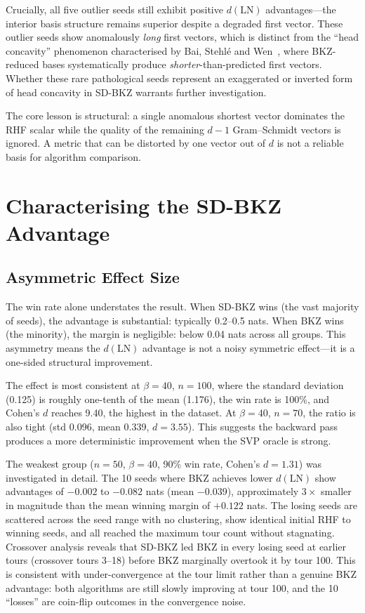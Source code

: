 \documentclass[journal=cic,version=preprint]{iacrj}
\begin{document}
Crucially, all five outlier seeds still exhibit positive $d(\mathrm{LN})$ advantages---the interior basis structure remains superior despite a degraded first vector. These outlier seeds show anomalously \emph{long} first vectors, which is distinct from the ``head concavity'' phenomenon characterised by Bai, Stehl\'{e} and Wen~\cite{AC:BaiSteWen18}, where BKZ-reduced bases systematically produce \emph{shorter}-than-predicted first vectors. Whether these rare pathological seeds represent an exaggerated or inverted form of head concavity in SD-BKZ warrants further investigation.

The core lesson is structural: a single anomalous shortest vector dominates the RHF scalar while the quality of the remaining $d-1$ Gram--Schmidt vectors is ignored. A metric that can be distorted by one vector out of $d$ is not a reliable basis for algorithm comparison.

\section{Characterising the SD-BKZ Advantage}
\label{sec:characterising}

\subsection{Asymmetric Effect Size}

The win rate alone understates the result. When SD-BKZ wins (the vast majority of seeds), the advantage is substantial: typically 0.2--0.5 nats. When BKZ wins (the minority), the margin is negligible: below 0.04 nats across all groups. This asymmetry means the $d(\mathrm{LN})$ advantage is not a noisy symmetric effect---it is a one-sided structural improvement.

The effect is most consistent at $\beta=40$, $n=100$, where the standard deviation (0.125) is roughly one-tenth of the mean (1.176), the win rate is 100\%, and Cohen's $d$ reaches 9.40, the highest in the dataset. At $\beta=40$, $n=70$, the ratio is also tight (std 0.096, mean 0.339, $d=3.55$). This suggests the backward pass produces a more deterministic improvement when the SVP oracle is strong.

The weakest group ($n=50$, $\beta=40$, 90\% win rate, Cohen's $d=1.31$) was investigated in detail. The 10 seeds where BKZ achieves lower $d(\mathrm{LN})$ show advantages of $-0.002$ to $-0.082$ nats (mean $-0.039$), approximately $3\times$ smaller in magnitude than the mean winning margin of $+0.122$ nats. The losing seeds are scattered across the seed range with no clustering, show identical initial RHF to winning seeds, and all reached the maximum tour count without stagnating. Crossover analysis reveals that SD-BKZ led BKZ in every losing seed at earlier tours (crossover tours 3--18) before BKZ marginally overtook it by tour 100. This is consistent with under-convergence at the tour limit rather than a genuine BKZ advantage: both algorithms are still slowly improving at tour 100, and the 10 ``losses'' are coin-flip outcomes in the convergence noise.
\end{document}
